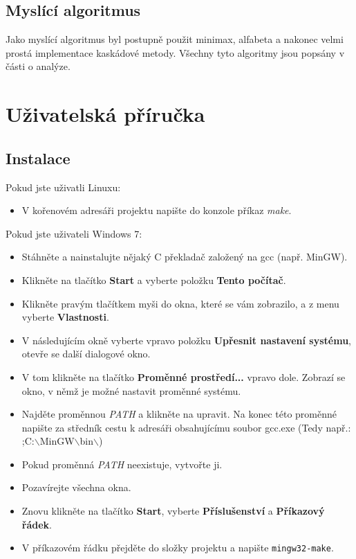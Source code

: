 \documentclass[11pt, titlepage]{article}
\begin{document}
\subsection{Myslící algoritmus}
Jako myslící algoritmus byl postupně použit minimax, alfabeta a nakonec velmi prostá implementace kaskádové metody. Všechny tyto algoritmy jsou popsány v části o analýze.

\section{Uživatelská příručka}

\subsection{Instalace}

Pokud jste uživatli Linuxu:
\begin{itemize}
	\item V kořenovém adresáři projektu napište do konzole příkaz {\it make}.
\end{itemize}
Pokud jste uživateli Windows 7:
\begin{itemize}
	\item Stáhněte a nainstalujte nějaký C překladač založený na gcc (např. MinGW).
	\item Klikněte na tlačítko { \bf Start} a vyberte položku { \bf Tento počítač}.
	\item Klikněte pravým tlačítkem myši do okna, které se vám zobrazilo, a z menu vyberte { \bf Vlastnosti}.
	\item V následujícím okně vyberte vpravo položku { \bf Upřesnit nastavení systému}, otevře se další dialogové okno.
	\item V tom klikněte na tlačítko { \bf Proměnné prostředí...} vpravo dole. Zobrazí se okno, v němž je možné nastavit proměnné systému.
	\item Najděte proměnnou { \it PATH} a klikněte na upravit. Na konec této proměnné napište za středník cestu k adresáři obsahujícímu soubor gcc.exe (Tedy např.: ;C:$\backslash$MinGW$\backslash$bin$\backslash$)
	\item Pokud proměnná { \it PATH} neexistuje, vytvořte ji.
	\item Pozavírejte všechna okna.
	\item Znovu klikněte na tlačítko { \bf Start}, vyberte { \bf Příslušenství} a { \bf Příkazový řádek}.
	\item V příkazovém řádku přejděte do složky projektu a napište { \tt mingw32-make}.
\end{itemize}
\end{document}
